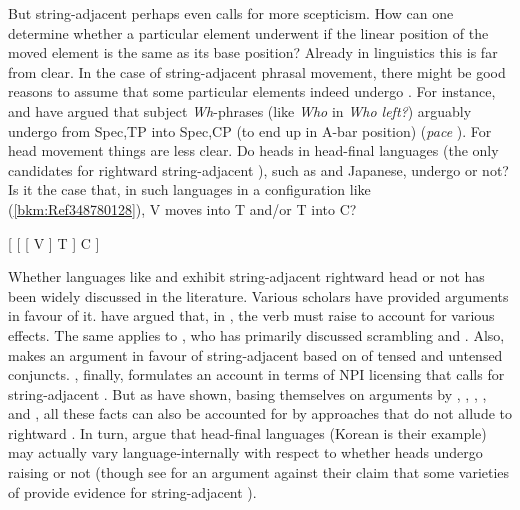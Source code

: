 \documentclass[output=paper]{langsci/langscibook}
\begin{document}
But string-adjacent  perhaps even calls for more scepticism. How can
one determine whether a particular element underwent  if the linear
position of the moved element is the same as its base position? Already in
linguistics this is far from clear. In the case of string-adjacent phrasal
movement, there might be good reasons to assume that some particular elements
indeed undergo . For instance, \citet{Pesetsky1987} and
\textcite{Bobaljik1995,Bobaljik:2002} have argued that subject
\emph{Wh}{}-phrases (like \emph{Who} in \emph{Who left?}) arguably
undergo  from Spec,TP into Spec,CP (to end up in A-bar position)
(\emph{pace} \citealt{Grimshaw1997}). For head movement things are less clear.
Do heads in head-final languages (the only candidates for rightward
string-adjacent ), such as  and Japanese,
undergo  or not? Is it the case that, in such languages in a
configuration like (\ref{bkm:Ref348780128}), V moves into T and/or T into C?

\ea\label{bkm:Ref348780128}
    {}[ [  [ V ] T ] C ]
\z

Whether languages like  and  exhibit string-adjacent rightward
head  or not has been widely discussed in the literature. Various
scholars have provided arguments in favour of it. \citet{OtaWhi1991} have
argued that, in , the verb must raise to account for various 
effects. The same applies to \textcite{Koizumi1995,Koizumi2000}, who has primarily discussed
scrambling and . Also, \citet{Yoon1994} makes an argument in favour
of string-adjacent  based on  of tensed and untensed
conjuncts. \citet{Choi1999}, finally, formulates an account in terms of NPI
licensing that calls for string-adjacent . But as
\textcite{Han:2007,HanMusLidz2016} have shown, basing themselves on arguments by \citet{Kim1995},
\citet{ChuPar1997}, \citet{Hoji1998}, \citet{Kim1999}, and \citet{FukSak2003},
all these facts can also be accounted for by approaches that do not allude to
rightward . In turn, \textcite{Han:2007,HanMusLidz2016} argue that head-final
languages (Korean is their example) may actually vary language-internally with
respect to whether heads undergo raising or not (though see
\citealt{Zeijlstra2017} for an argument against their claim that some varieties
of  provide evidence for string-adjacent ).
\end{document}
